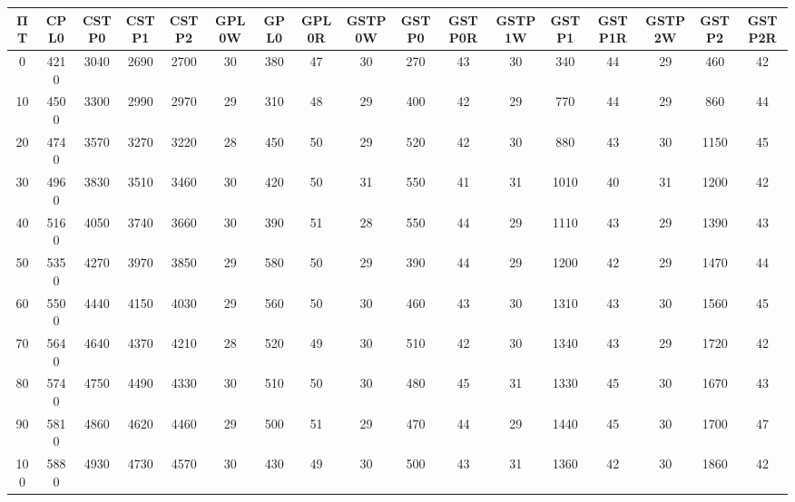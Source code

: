 \begin{tabular}{|c|c|c|c|c|c|c|c|c|c|c|c|c|c|c|c|c|}
\hline
ΠΤ&CPL0&CSTP0&CSTP1&CSTP2&GPL0W&GPL0&GPL0R&GSTP0W&GSTP0&GSTP0R&GSTP1W&GSTP1&GSTP1R&GSTP2W&GSTP2&GSTP2R\\\hline
\hline
0&4210&3040&2690&2700&30&380&47&30&270&43&30&340&44&29&460&42\\
\hline
10&4500&3300&2990&2970&29&310&48&29&400&42&29&770&44&29&860&44\\
\hline
20&4740&3570&3270&3220&28&450&50&29&520&42&30&880&43&30&1150&45\\
\hline
30&4960&3830&3510&3460&30&420&50&31&550&41&31&1010&40&31&1200&42\\
\hline
40&5160&4050&3740&3660&30&390&51&28&550&44&29&1110&43&29&1390&43\\
\hline
50&5350&4270&3970&3850&29&580&50&29&390&44&29&1200&42&29&1470&44\\
\hline
60&5500&4440&4150&4030&29&560&50&30&460&43&30&1310&43&30&1560&45\\
\hline
70&5640&4640&4370&4210&28&520&49&30&510&42&30&1340&43&29&1720&42\\
\hline
80&5740&4750&4490&4330&30&510&50&30&480&45&31&1330&45&30&1670&43\\
\hline
90&5810&4860&4620&4460&29&500&51&29&470&44&29&1440&45&30&1700&47\\
\hline
100&5880&4930&4730&4570&30&430&49&30&500&43&31&1360&42&30&1860&42\\
\hline
\end{tabular}
